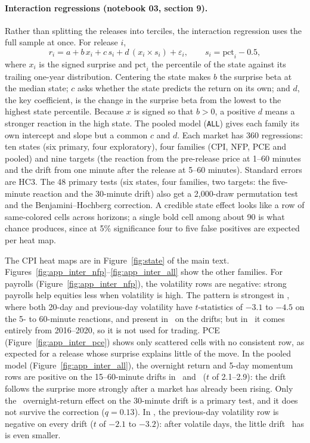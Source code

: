 \paragraph{Interaction regressions (notebook 03, section 9).} Rather than splitting the releases
into terciles, the interaction regression uses the full sample at once. For release $i$,
\begin{equation}\label{eq:app_inter}
  r_i = a + b\,x_i + c\,s_i + d\,(x_i\times s_i) + \varepsilon_i,\qquad s_i=\text{pct}_i-0.5,
\end{equation}
where $x_i$ is the signed surprise and $\text{pct}_i$ the percentile of the state against its
trailing one-year distribution. Centering the state makes $b$ the surprise beta at the median
state; $c$ asks whether the state predicts the return on its own; and $d$, the key coefficient, is
the change in the surprise beta from the lowest to the highest state percentile. Because $x$ is
signed so that $b>0$, a positive $d$ means a stronger reaction in the high state. The pooled model
(\texttt{ALL}) gives each family its own intercept and slope but a common $c$ and $d$. Each market
has 360 regressions: ten states (six primary, four exploratory), four families (CPI, NFP, PCE and
pooled) and nine targets (the reaction from the pre-release price at 1--60 minutes and the drift
from one minute after the release at 5--60 minutes). Standard errors are HC3. The 48 primary tests
(six states, four families, two targets: the five-minute reaction and the 30-minute drift) also get
a 2,000-draw permutation test and the Benjamini--Hochberg correction. A credible state effect looks
like a row of same-colored cells across horizons; a single bold cell among about 90 is what chance
produces, since at 5\% significance four to five false positives are expected per heat map.

The CPI heat maps are in Figure~\ref{fig:state} of the main text. Figures~\ref{fig:app_inter_nfp}--\ref{fig:app_inter_all}
show the other families. For payrolls (Figure~\ref{fig:app_inter_nfp}), the volatility rows are
negative: strong payrolls help equities less when volatility is high. The pattern is strongest in
\YM, where both 20-day and previous-day volatility have $t$-statistics of $-3.1$ to $-4.5$ on the
5- to 60-minute reactions, and present in \ES\ on the drifts; but in \YM\ it comes entirely from 2016--2020,
so it is not used for trading. PCE (Figure~\ref{fig:app_inter_pce}) shows only scattered cells with
no consistent row, as expected for a release whose surprise explains little of the move. In the
pooled model (Figure~\ref{fig:app_inter_all}), the overnight return and 5-day momentum rows are
positive on the 15--60-minute drifts in \ES\ and \YM\ ($t$ of 2.1--2.9): the drift follows the surprise
more strongly after a market has already been rising. Only the \ES\ overnight-return effect on the
30-minute drift is a primary test, and it does not survive the correction ($q=0.13$). In \ZN, the
previous-day volatility row is negative on every drift ($t$ of $-2.1$ to $-3.2$): after volatile
days, the little drift \ZN\ has is even smaller.

